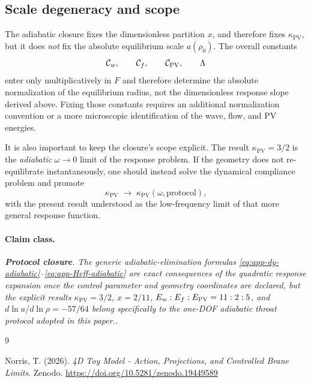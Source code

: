 \documentclass[11pt]{article}
\newcommand{\kPV}{\kappa_{\mathrm{PV}}}
\newcommand{\Protocol}{\textbf{Protocol closure}}
\newcommand{\claimclass}[1]{\paragraph{Claim class.}\emph{#1.}}
\begin{document}
\subsection{Scale degeneracy and scope}
\label{app:adiabatic-scope}

The adiabatic closure fixes the dimensionless partition \(x\), and therefore fixes
\(\kPV\), but it does \emph{not} fix the absolute equilibrium scale \(a(\rho_0)\). The
overall constants
\begin{equation}
\mathcal C_w,\qquad \mathcal C_f,\qquad \mathcal C_{\rm PV},\qquad \Lambda
\label{eq:app-scale-constants}
\end{equation}
enter only multiplicatively in \(F\) and therefore determine the absolute normalization of
the equilibrium radius, not the dimensionless response slope derived above. Fixing those
constants requires an additional normalization convention or a more microscopic
identification of the wave, flow, and PV energies.

It is also important to keep the closure's scope explicit. The result
\(\kPV=3/2\) is the \emph{adiabatic} \(\omega\to 0\) limit of the response problem. If the
geometry does not re-equilibrate instantaneously, one should instead solve the dynamical
compliance problem and promote
\begin{equation}
\kPV
\;\to\;
\kPV(\omega,\text{protocol}),
\label{eq:app-kPV-omega}
\end{equation}
with the present result understood as the low-frequency limit of that more general
response function.

\claimclass{\Protocol. The generic adiabatic-elimination formulas
\eqref{eq:app-dy-adiabatic}--\eqref{eq:app-Heff-adiabatic} are exact consequences of the
quadratic response expansion once the control parameter and geometry coordinates are
declared, but the explicit results
\(\kPV=3/2\), \(x=2/11\), \(E_w:E_f:E_{\rm PV}=11:2:5\), and
\(d\ln a/d\ln\rho=-57/64\) belong specifically to the one-DOF adiabatic throat protocol
adopted in this paper.}

\begin{thebibliography}{9}

Norris, T. (2026).
\textit{4D Toy Model - Action, Projections, and Controlled Brane Limits}.
Zenodo.
\url{https://doi.org/10.5281/zenodo.19449589}

\end{thebibliography}
\end{document}
